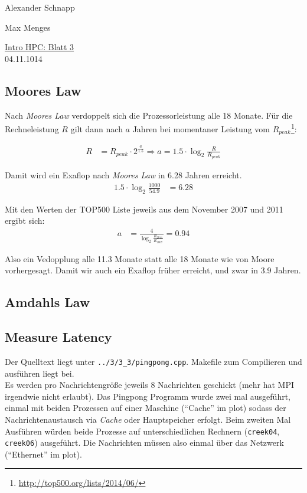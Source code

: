 \documentclass[a4paper,11pt]{scrartcl}
\begin{document}
\hfill Alexander Schnapp

\hfill Max Menges

\begin{center}
\underline{\Huge{Intro HPC: Blatt 3}}\\
\large{04.11.1014}\\
\end{center}


\subsection{Moores Law}
Nach \emph{Moores Law} verdoppelt sich die Prozessorleistung alle 18 Monate. Für die Rechneleistung $R$ gilt dann nach $a$ Jahren bei momentaner Leistung vom $R_{peak}$\footnote{\url{http://top500.org/lists/2014/06/}}:

\begin{align*}
R&=R_{peak}\cdot 2^{\frac{a}{1.5}} \Rightarrow a = 1.5\cdot \log_2{\frac{R}{R_{peak}}}
\end{align*}

Damit wird ein Exaflop nach \emph{Moores Law} in 6.28 Jahren erreicht.
\begin{align*}
1.5\cdot \log_2{\frac{1000}{54.9}}&=6.28
\end{align*}

Mit den Werten der TOP500 Liste jeweils aus dem November 2007 und 2011 ergibt sich:
\begin{align*}
    a&= \frac{4}{\log_2{\frac{R_{2011}}{R_{2007}}}}=0.94
\end{align*}

Also ein Vedopplung alle 11.3 Monate statt alle 18 Monate wie von Moore vorhergesagt. Damit wir auch ein Exaflop früher erreicht, und zwar in 3.9 Jahren.\\

\subsection{Amdahls Law}

\subsection{Measure Latency}

Der Quelltext liegt unter \verb+../3/3_3/pingpong.cpp+. Makefile zum Compilieren und ausführen liegt bei. \\

Es werden pro Nachrichtengröße jeweils 8 Nachrichten geschickt (mehr hat MPI irgendwie nicht erlaubt). Das Pingpong Programm wurde zwei mal ausgeführt, einmal mit beiden Prozessen auf einer Maschine ("`Cache"' im plot) sodass der Nachrichtenaustausch via \emph{Cache} oder Hauptspeicher erfolgt. Beim zweiten Mal Ausführen würden beide Prozesse auf unterschiedlichen Rechnern (\verb+creek04+, \verb+creek06+) ausgeführt. Die Nachrichten müssen also einmal über das Netzwerk ("`Ethernet"' im plot).\\
\end{document}
